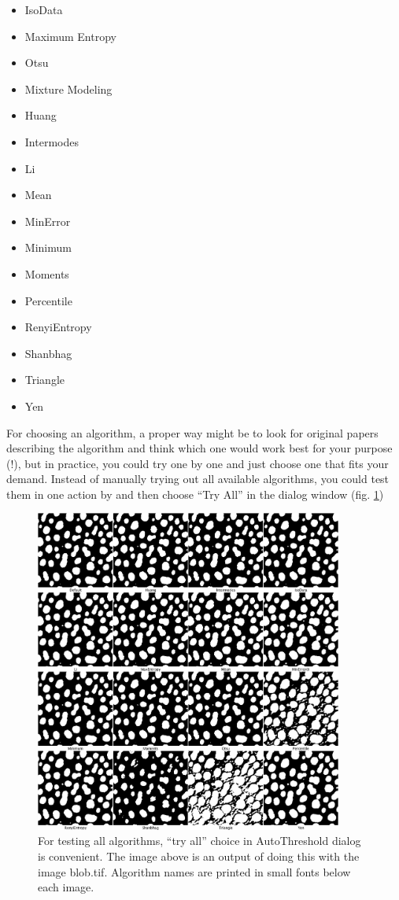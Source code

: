 \begin{itemize}
\item IsoData
\item Maximum Entropy
\item Otsu
\item Mixture Modeling
\item Huang
\item Intermodes
\item Li
\item Mean
\item MinError
\item Minimum
\item Moments
\item Percentile
\item RenyiEntropy
\item Shanbhag
\item Triangle
\item Yen
\end{itemize}

For choosing an algorithm, a proper way might be to look for original papers
describing the algorithm and think which one would work best for your
purpose (!), but in practice, you could try one by one and just choose one
that fits your demand. Instead of manually trying out all available algorithms, you could test them in one action by  and then choose ``Try All'' in the dialog window (fig. \ref{fig:thresholdTryAll})


\begin{figure}
\begin{center}
\includegraphics[width=0.9\textwidth]{fig/ThresholdTryAll.png}
\caption{For testing all algorithms, ``try all'' choice in AutoThreshold dialog is convenient. The image above is an output of doing this with the image blob.tif. Algorithm names are printed in small fonts below each image.} 
\label{fig:thresholdTryAll}
\end{center}
\end{figure}

